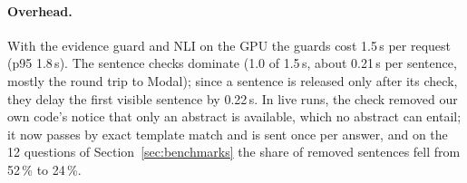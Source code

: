 \paragraph{Overhead.}
With the evidence guard and NLI on the GPU the guards cost 1.5\,s per request (p95 1.8\,s).
The sentence checks dominate (1.0 of 1.5\,s, about 0.21\,s per sentence, mostly the round trip to Modal); since a sentence is released only after its check, they delay the first visible sentence by 0.22\,s.
In live runs, the check removed our own code's notice that only an abstract is available, which no abstract can entail; it now passes by exact template match and is sent once per answer, and on the 12 questions of Section~\ref{sec:benchmarks} the share of removed sentences fell from 52\,\% to 24\,\%.
